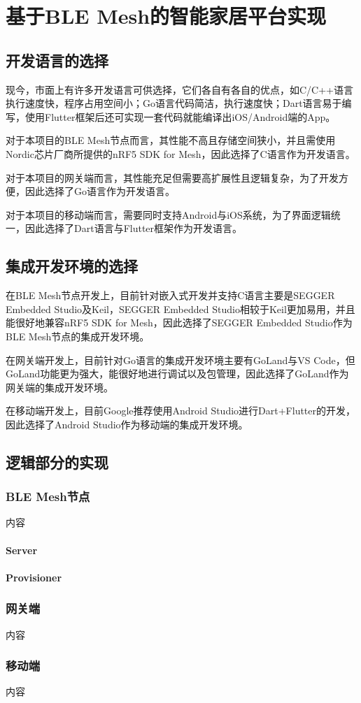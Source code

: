 \chapter{基于BLE Mesh的智能家居平台实现}
\section{开发语言的选择}
现今，市面上有许多开发语言可供选择，它们各自有各自的优点，如C/C++语言执行速度快，程序占用空间小；Go语言代码简洁，执行速度快；Dart语言易于编写，使用Flutter框架后还可实现一套代码就能编译出iOS/Android端的App。

对于本项目的BLE Mesh节点而言，其性能不高且存储空间狭小，并且需使用Nordic芯片厂商所提供的nRF5 SDK for Mesh，因此选择了C语言作为开发语言。

对于本项目的网关端而言，其性能充足但需要高扩展性且逻辑复杂，为了开发方便，因此选择了Go语言作为开发语言。

对于本项目的移动端而言，需要同时支持Android与iOS系统，为了界面逻辑统一，因此选择了Dart语言与Flutter框架作为开发语言。

\section{集成开发环境的选择}
在BLE Mesh节点开发上，目前针对嵌入式开发并支持C语言主要是SEGGER Embedded Studio及Keil，SEGGER Embedded Studio相较于Keil更加易用，并且能很好地兼容nRF5 SDK for Mesh，因此选择了SEGGER Embedded Studio作为BLE Mesh节点的集成开发环境。

在网关端开发上，目前针对Go语言的集成开发环境主要有GoLand与VS Code，但GoLand功能更为强大，能很好地进行调试以及包管理，因此选择了GoLand作为网关端的集成开发环境。

在移动端开发上，目前Google推荐使用Android Studio进行Dart+Flutter的开发，因此选择了Android Studio作为移动端的集成开发环境。
\section{逻辑部分的实现}
\subsection{BLE Mesh节点}
内容
\subsubsection{Server}
\subsubsection{Provisioner}

\subsection{网关端}
内容

\subsection{移动端}
内容
